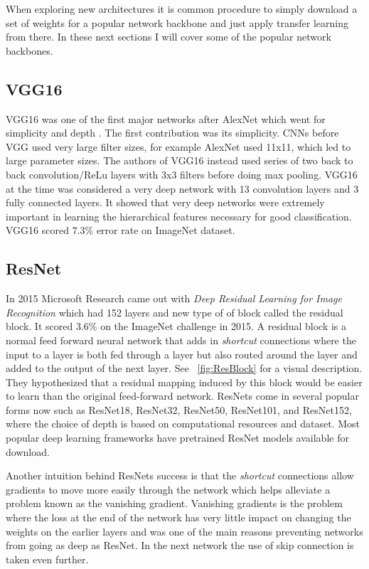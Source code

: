 When exploring new architectures it is common procedure to simply download a set of weights for a popular network backbone and just apply transfer learning from there. In these next sections I will cover some of the popular network backbones.

\subsection{VGG16}

VGG16 was one of the first major networks after AlexNet which went for simplicity and depth \cite{VGG16}. The first contribution was its simplicity. CNNs before VGG used very large filter sizes, for example AlexNet used 11x11, which led to large parameter sizes. The authors of VGG16 instead used series of two back to back convolution/ReLu layers with 3x3 filters before doing max pooling. VGG16 at the time was considered a very deep network with 13 convolution layers and 3 fully connected layers. It showed that very deep networks were extremely important in learning the hierarchical features necessary for good classification. VGG16 scored $7.3\%$ error rate on ImageNet dataset.

\subsection{ResNet}

In 2015 Microsoft Research came out with \textit{Deep Residual Learning for Image Recognition} \cite{ResNet} which had 152 layers and new type of of block called the residual block. It scored $3.6\%$ on the ImageNet challenge in 2015. A residual block is a normal feed forward neural network that adds in \textit{shortcut} connections where the input to a layer is both fed through a layer but also routed around the layer and added to the output of the next layer. See ~\ref{fig:ResBlock} for a visual description. They hypothesized that a residual mapping induced by this block would be easier to learn than the original feed-forward network. ResNets come in several popular forms now such as ResNet18, ResNet32, ResNet50, ResNet101, and ResNet152, where the choice of depth is based on computational resources and dataset. Most popular deep learning frameworks have pretrained ResNet models available for download.

Another intuition behind ResNets success is that the \textit{shortcut} connections allow gradients to move more easily through the network which helps alleviate a problem known as the vanishing gradient. Vanishing gradients is the problem where the loss at the end of the network has very little impact on changing the weights on the earlier layers and was one of the main reasons preventing networks from going as deep as ResNet. In the next network the use of skip connection is taken even further.

